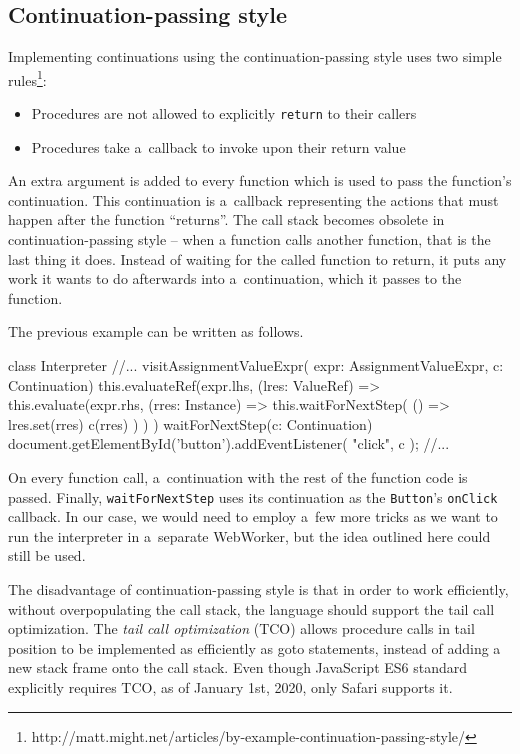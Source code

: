 \subsection*{Continuation-passing style}
\label{chap4:continuations}
Implementing continuations using the continuation-passing style uses two simple rules\footnote{http://matt.might.net/articles/by-example-continuation-passing-style/}:
\begin{itemize}
    \item Procedures are not allowed to explicitly \texttt{return} to their callers
    \item Procedures take a~callback to invoke upon their return value
\end{itemize}
An extra argument is added to every function which is used to pass the function's continuation. This continuation is a~callback
representing the actions that must happen after the function ``returns''. The call stack becomes obsolete in continuation-passing style -- when
a function calls another function, that is the last thing it does. Instead of waiting for the called function to return, it puts any work
it wants to do afterwards into a~continuation, which it passes to the function.

The previous example can be written as follows.
\begin{code}
class Interpreter {
    //...
    visitAssignmentValueExpr(
        expr: AssignmentValueExpr, c: Continuation) {
        this.evaluateRef(expr.lhs, (lres: ValueRef) => {
            this.evaluate(expr.rhs, (rres: Instance) => {
                this.waitForNextStep(
                    () => {
                        lres.set(rres)
                        c(rres)
                })
            })
        })
    }
    waitForNextStep(c: Continuation) {
        document.getElementById('button').addEventListener(
            "click",
            c
        );
    }
    //...
}
\end{code}

On every function call, a~continuation with the rest of the function code is passed. Finally, \texttt{waitForNextStep} uses its continuation as the \texttt{Button}'s
\texttt{onClick} callback. In our case, we would need to employ a~few more tricks as we want to run the interpreter in a~separate WebWorker, but the idea
outlined here could still be used.

The disadvantage of continuation-passing style is that in order to work efficiently, without overpopulating the call stack, the language should support the tail
call optimization. The \emph{tail call optimization} (TCO) allows procedure calls in tail position to be implemented as efficiently as goto statements, instead of adding
a new stack frame onto the call stack. Even though JavaScript ES6 standard explicitly requires TCO, as of January 1st, 2020, only Safari supports it.

